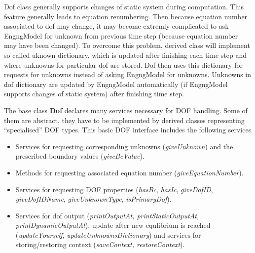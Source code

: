 \documentclass[12pt,draft]{article}
\newcommand{\class}[1]{{\bf #1}}
\newcommand{\service}[1]{{\em #1}}
\begin{document}
Dof class generally supports changes of static system during computation.
This feature generally leads to equation renumbering. Then because equation number
associated to dof may change, it may become extremly complicated to ask EngngModel
for unknown from previous time step (because equation number may have been changed).
To overcome this problem, derived class will implement so called uknown dictionary,
which is updated after finishing each time step and where unknowns for particular
dof are stored. Dof then uses this dictionary for requests for unknowns instead of 
asking EngngModel for unknowns. Unknowns in dof dictionary are updated by EngngModel
automatically (if EngngModel supports changes of static system) after finishing time
step. 

The base class \class{Dof} declares many services necessary for DOF
handling. Some of them are abstract, they have to be implemented by
derived classes representing ``specialised'' DOF types.
This basic DOF interface includes the following services
\begin{itemize}
\item
Services for requesting corresponding unknowns (\service{giveUnknown})
and the prescribed boundary values (\service{giveBcValue}).
\item
Methods for requesting associated equation number
(\service{giveEquationNumber}).
\item
Services for requesting DOF properties (\service{hasBc},
\service{hasIc}, \service{giveDofID}, \service{giveDofIDName},
\service{giveUnknownType}, \service{isPrimaryDof}).
\item
Services for dof output (\service{printOutputAt, printStaticOutputAt,
printDynamicOutputAt}), update after new equlibrium is reached
(\service{updateYourself}, \service{updateUnknownsDictionary}) and
services for storing/restoring context (\service{saveContext, restoreContext}).
\end{itemize}
\end{document}
